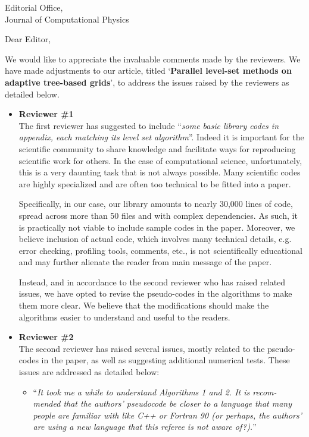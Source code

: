 \documentclass{scrlttr2}
\begin{document}
 
\begin{letter} {Editorial Office, \\ Journal of Computational
Physics} 

\opening{Dear Editor,} 
We would like to appreciate the invaluable comments made by the reviewers. We
have made adjustments to our article, titled `\textbf{Parallel level-set methods
on adaptive tree-based grids}', to address the issues raised by the reviewers as
detailed below. 

\begin{itemize} 
\item \textbf{Reviewer \#1} \\ 
The first reviewer has suggested to include ``\textit{some basic library codes
in appendix, each matching its level set algorithm}''. Indeed it is important
for the scientific community to share knowledge and facilitate ways for
reproducing scientific work for others. In the case of computational science,
unfortunately, this is a very daunting task that is not always possible.  Many
scientific codes are highly specialized and are often too technical to be fitted
into a paper. 

Specifically, in our case, our library amounts to nearly 30,000 lines of code,
spread across more than 50 files and with complex dependencies. As such, it is
practically not viable to include sample codes in the paper. Moreover, we
believe inclusion of actual code, which involves many technical details, e.g.
error checking, profiling tools, comments, etc., is not scientifically
educational and may further alienate the reader from main message of the paper.

Instead, and in accordance to the second reviewer who has raised related issues,
we have opted to revise the pseudo-codes in the algorithms to make them more
clear. We believe that the modifications should make the algorithms easier to
understand and useful to the readers.

\item \textbf{Reviewer \#2} \\ 
The second reviewer has raised several issues, mostly related to the
pseudo-codes in the paper, as well as suggesting additional numerical tests.
These issues are addressed as detailed below: 

\begin{itemize} 
\item ``\textit{It took me a while to understand Algorithms 1 and 2. It is
  recom- mended that the authors’ pseudocode be closer to a language that many
people are familiar with like C++ or Fortran 90 (or perhaps, the authors’ are
using a new language that this referee is not aware of?).}''


\end{itemize}
\end{itemize}
\end{letter}
\end{document}
